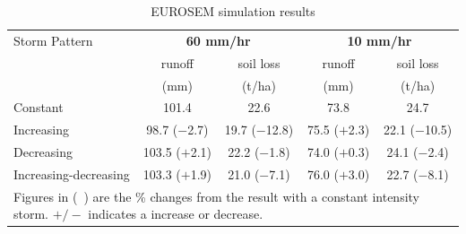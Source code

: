 \begin{table}[htbp]
  \caption{EUROSEM simulation results}
  \label{tab:EUROSEMimulationResults}
  \centering
    \begin{tabular}{lcccc}
      \toprule
      Storm Pattern & \multicolumn{2}{c}{\textbf{60 mm/hr}} &
\multicolumn{2}{c}{\textbf{10 mm/hr}}\\
      \cmidrule(r){2-3} \cmidrule(l){4-5}
      & runoff  & soil loss  & runoff & soil loss \\
      & (mm) & (t/ha) & (mm) & (t/ha) \\
      \midrule
      Constant   & 101.4 & 22.6 & 73.8 & 24.7\\
      Increasing & 98.7 ($-$2.7)& 19.7 ($-$12.8)& 75.5 ($+$2.3)& 22.1
($-$10.5)\\
      Decreasing & 103.5 ($+$2.1)& 22.2 ($-$1.8)& 74.0 ($+$0.3) & 24.1
($-$2.4)\\
      Increasing-decreasing & 103.3 ($+$1.9)& 21.0 ($-$7.1)& 76.0 ($+$3.0)& 22.7
($-$8.1)\\
      \bottomrule
      \multicolumn{5}{p{10cm}}{\footnotesize Figures in (\ )
are the \% changes from the result with a constant intensity storm. $+/-$
indicates a increase or decrease.}\\
    \end{tabular}
\end{table}


